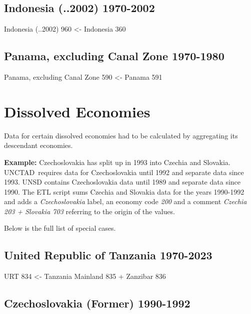 \documentclass[
]{book}
\begin{document}
\subsection*{Indonesia (..2002) 1970-2002}\label{indonesia-..2002-1970-2002}

Indonesia (..2002) 960 \textless- Indonesia 360

\subsection*{Panama, excluding Canal Zone 1970-1980}\label{panama-excluding-canal-zone-1970-1980}

Panama, excluding Canal Zone 590 \textless- Panama 591

\section{Dissolved Economies}\label{dissolved-economies}

Data for certain dissolved economies had to be calculated by aggregating its descendant economies.

\textbf{Example:} Czechoslovakia has split up in 1993 into Czechia and Slovakia. UNCTAD~requires data for Czechoslovakia until 1992 and separate data since 1993. UNSD contains Czechoslovakia data until 1989 and separate data since 1990. The ETL script sums Czechia and Slovakia data for the years 1990-1992 and adds a \emph{Czechoslovakia} label, an economy code \emph{200} and a comment \emph{Czechia 203 + Slovakia 703} referring to the origin of the values.

Below is the full list of special cases.

\subsection*{United Republic of Tanzania 1970-2023}\label{united-republic-of-tanzania-1970-2023}

URT 834 \textless- Tanzania Mainland 835 + Zanzibar 836

\subsection*{Czechoslovakia (Former) 1990-1992}\label{czechoslovakia-former-1990-1992}
\end{document}
